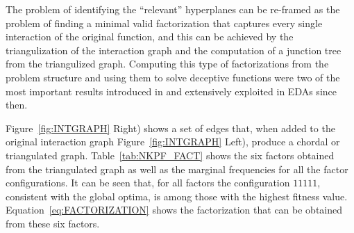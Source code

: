 \documentclass{article} %
\begin{document}
 The problem of identifying the ``relevant'' hyperplanes can be re-framed as the problem of finding a minimal valid factorization that captures every single interaction of the original function, and this can be achieved by the triangulization of the interaction graph and the computation of a junction tree from the triangulized graph.  Computing this type of factorizations from the problem structure and using them to solve deceptive functions were two of the most important results introduced in \cite{Muhlenbein_et_al:1999} and extensively exploited in EDAs since then. 

 Figure~\ref{fig:INTGRAPH} Right) shows a set of edges that, when added to the original interaction graph Figure~\ref{fig:INTGRAPH} Left), produce a chordal or triangulated graph. Table~\ref{tab:NKPF_FACT} shows the six factors obtained from the triangulated graph as well as the marginal frequencies for all the factor configurations. It can be seen that, for all factors the configuration $11111$, consistent with the global optima, is among those with the highest fitness value. Equation~\eqref{eq:FACTORIZATION} shows the factorization that can be obtained from these six factors. 
  
\end{document}
